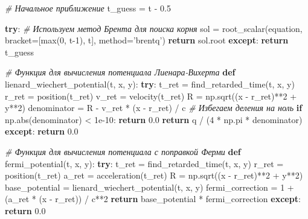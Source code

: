 \documentclass[11pt]{article}
\newenvironment{Shaded}{}{}
\newcommand{\KeywordTok}[1]{\textcolor[rgb]{0.00,0.44,0.13}{\textbf{{#1}}}}
\newcommand{\DecValTok}[1]{\textcolor[rgb]{0.25,0.63,0.44}{{#1}}}
\newcommand{\FloatTok}[1]{\textcolor[rgb]{0.25,0.63,0.44}{{#1}}}
\newcommand{\StringTok}[1]{\textcolor[rgb]{0.25,0.44,0.63}{{#1}}}
\newcommand{\CommentTok}[1]{\textcolor[rgb]{0.38,0.63,0.69}{\textit{{#1}}}}
\newcommand{\NormalTok}[1]{{#1}}
\newcommand{\ControlFlowTok}[1]{\textcolor[rgb]{0.00,0.44,0.13}{\textbf{{#1}}}}
\newcommand{\OperatorTok}[1]{\textcolor[rgb]{0.40,0.40,0.40}{{#1}}}
\newcommand{\BuiltInTok}[1]{{#1}}
\begin{document}
\begin{Shaded}
\begin{Highlighting}[]
    \CommentTok{# Начальное приближение}
\NormalTok{    t_guess }\OperatorTok{=}\NormalTok{ t }\OperatorTok{-} \FloatTok{0.5}

    \ControlFlowTok{try}\NormalTok{:}
        \CommentTok{# Используем метод Брента для поиска корня}
\NormalTok{        sol }\OperatorTok{=}\NormalTok{ root_scalar(equation, bracket}\OperatorTok{=}\NormalTok{[}\BuiltInTok{max}\NormalTok{(}\DecValTok{0}\NormalTok{, t}\DecValTok{-1}\NormalTok{), t], method}\OperatorTok{=}\StringTok{'brentq'}\NormalTok{)}
        \ControlFlowTok{return}\NormalTok{ sol.root}
    \ControlFlowTok{except}\NormalTok{:}
        \ControlFlowTok{return}\NormalTok{ t_guess}

\CommentTok{# Функция для вычисления потенциала Лиенара-Вихерта}
\KeywordTok{def}\NormalTok{ lienard_wiechert_potential(t, x, y):}
    \ControlFlowTok{try}\NormalTok{:}
\NormalTok{        t_ret }\OperatorTok{=}\NormalTok{ find_retarded_time(t, x, y)}
\NormalTok{        r_ret }\OperatorTok{=}\NormalTok{ position(t_ret)}
\NormalTok{        v_ret }\OperatorTok{=}\NormalTok{ velocity(t_ret)}
\NormalTok{        R }\OperatorTok{=}\NormalTok{ np.sqrt((x }\OperatorTok{-}\NormalTok{ r_ret)}\OperatorTok{**}\DecValTok{2} \OperatorTok{+}\NormalTok{ y}\OperatorTok{**}\DecValTok{2}\NormalTok{)}
\NormalTok{        denominator }\OperatorTok{=}\NormalTok{ R }\OperatorTok{-}\NormalTok{ v_ret }\OperatorTok{*}\NormalTok{ (x }\OperatorTok{-}\NormalTok{ r_ret) }\OperatorTok{/}\NormalTok{ c}
        \CommentTok{# Избегаем деления на ноль}
        \ControlFlowTok{if}\NormalTok{ np.}\BuiltInTok{abs}\NormalTok{(denominator) }\OperatorTok{<} \FloatTok{1e-10}\NormalTok{:}
            \ControlFlowTok{return} \FloatTok{0.0}
        \ControlFlowTok{return}\NormalTok{ q }\OperatorTok{/}\NormalTok{ (}\DecValTok{4} \OperatorTok{*}\NormalTok{ np.pi }\OperatorTok{*}\NormalTok{ denominator)}
    \ControlFlowTok{except}\NormalTok{:}
        \ControlFlowTok{return} \FloatTok{0.0}

\CommentTok{# Функция для вычисления потенциала с поправкой Ферми}
\KeywordTok{def}\NormalTok{ fermi_potential(t, x, y):}
    \ControlFlowTok{try}\NormalTok{:}
\NormalTok{        t_ret }\OperatorTok{=}\NormalTok{ find_retarded_time(t, x, y)}
\NormalTok{        r_ret }\OperatorTok{=}\NormalTok{ position(t_ret)}
\NormalTok{        a_ret }\OperatorTok{=}\NormalTok{ acceleration(t_ret)}
\NormalTok{        R }\OperatorTok{=}\NormalTok{ np.sqrt((x }\OperatorTok{-}\NormalTok{ r_ret)}\OperatorTok{**}\DecValTok{2} \OperatorTok{+}\NormalTok{ y}\OperatorTok{**}\DecValTok{2}\NormalTok{)}
\NormalTok{        base_potential }\OperatorTok{=}\NormalTok{ lienard_wiechert_potential(t, x, y)}
\NormalTok{        fermi_correction }\OperatorTok{=} \DecValTok{1} \OperatorTok{+}\NormalTok{ (a_ret }\OperatorTok{*}\NormalTok{ (x }\OperatorTok{-}\NormalTok{ r_ret)) }\OperatorTok{/}\NormalTok{ c}\OperatorTok{**}\DecValTok{2}
        \ControlFlowTok{return}\NormalTok{ base_potential }\OperatorTok{*}\NormalTok{ fermi_correction}
    \ControlFlowTok{except}\NormalTok{:}
        \ControlFlowTok{return} \FloatTok{0.0}


\end{Highlighting}
\end{Shaded}
\end{document}
